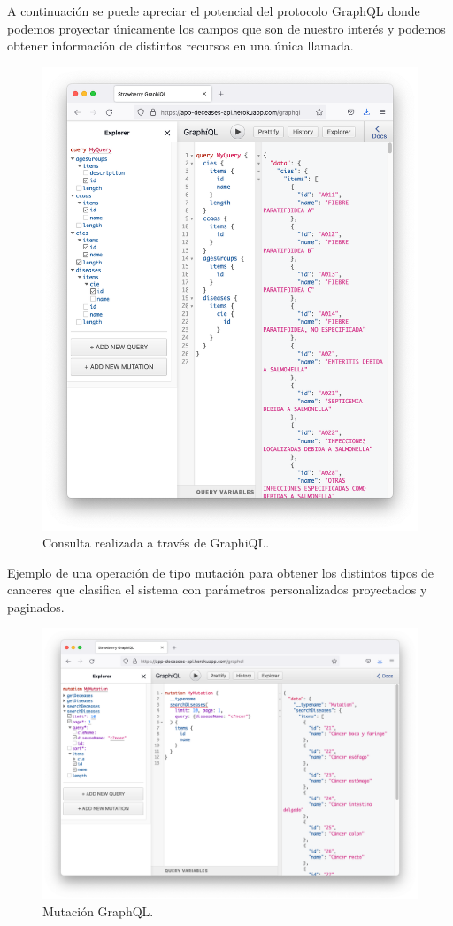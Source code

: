 A continuación se puede apreciar el potencial del protocolo GraphQL donde podemos
proyectar únicamente los campos que son de nuestro interés y podemos obtener información
de distintos recursos en una única llamada.
\FloatBarrier
\begin{figure}[h]
	\centering
	\includegraphics[width=\textwidth]{doc/logos/imgs/ejemplo3.png}
	\caption{ Consulta realizada a través de GraphiQL. }
\end{figure}
\FloatBarrier

Ejemplo de una operación de tipo mutación para obtener los distintos tipos de canceres que
clasifica el sistema con parámetros personalizados proyectados y paginados.
\FloatBarrier
\begin{figure}[h]
	\centering
	\includegraphics[width=\textwidth]{doc/logos/imgs/ejemplo4.png}
	\caption{ Mutación GraphQL. }
\end{figure}
\FloatBarrier

